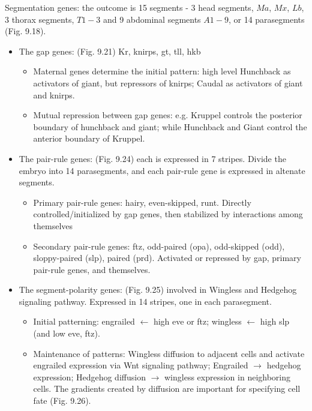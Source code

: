 \documentclass{report}
\begin{document}
Segmentation genes: the outcome is 15 segments - 3 head segments, $Ma$, $Mx$, $Lb$, 3 thorax segments, $T1-3$ and 9 abdominal segments $A1-9$, or 14 parasegments (Fig. 9.18).  
\begin{itemize}
\item The gap genes: (Fig. 9.21) Kr, knirps, gt, tll, hkb
\begin{itemize}
\item Maternal genes determine the initial pattern: high level Hunchback as activators of giant, but repressors of knirps; Caudal as activators of giant and knirps. 
\item Mutual repression between gap genes: e.g. Kruppel controls the posterior boundary of hunchback and giant; while Hunchback and Giant control the anterior boundary of Kruppel. 
\end{itemize}
\item The pair-rule genes: (Fig. 9.24) each is expressed in 7 stripes. Divide the embryo into 14 parasegments, and each pair-rule gene is expressed in altenate segments. 
\begin{itemize}
\item Primary pair-rule genes: hairy, even-skipped, runt. Directly controlled/initialized by gap genes, then stabilized by interactions among themselves
\item Secondary pair-rule genes: ftz, odd-paired (opa), odd-skipped (odd), sloppy-paired (slp), paired (prd). Activated or repressed by gap, primary pair-rule genes, and themselves. 
\end{itemize}
\item The segment-polarity genes: (Fig. 9.25) involved in Wingless and Hedgehog signaling pathway. Expressed in 14 stripes, one in each parasegment. 
\begin{itemize}
\item Initial patterning: engrailed $\leftarrow$ high eve or ftz; wingless $\leftarrow$ high slp (and low eve, ftz). 
\item Maintenance of patterns: Wingless diffusion to adjacent cells and activate engrailed expression via Wnt signaling pathway; Engrailed $\rightarrow$ hedgehog expression; Hedgehog diffusion $\rightarrow$ wingless expression in neighboring cells. The gradients created by diffusion are important for specifying cell fate (Fig. 9.26). 
\end{itemize}
\end{itemize}
\end{document}
